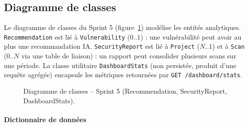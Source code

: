 \subsection{Diagramme de classes}

Le diagramme de classes du Sprint 5 (figure~\ref{fig:sprint5-class}) modélise les entités analytiques. \texttt{Recommendation} est lié à \texttt{Vulnerability} (\(0..1\)) : une vulnérabilité peut avoir au plus une recommandation IA. \texttt{SecurityReport} est lié à \texttt{Project} (\(N..1\)) et à \texttt{Scan} (\(0..N\) via une table de liaison) : un rapport peut consolider plusieurs scans sur une période. La classe utilitaire \texttt{DashboardStats} (non persistée, produit d'une requête agrégée) encapsule les métriques retournées par \texttt{GET /dashboard/stats}.

\begin{figure}[H]
\centering
\fbox{\rule{0pt}{2in}\rule{0.9\linewidth}{0pt}}
\caption{Diagramme de classes -- Sprint 5 (Recommendation, SecurityReport, DashboardStats).}
\label{fig:sprint5-class}
\end{figure}

\paragraph{Dictionnaire de données}

